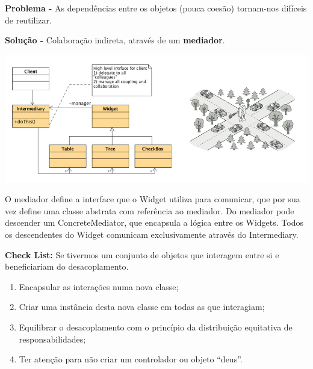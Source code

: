 \documentclass{article}
\begin{document}
\begin{flushleft}
    \textbf{Problema -} As dependências entre os objetos (pouca coesão) tornam-nos difíceis de reutilizar.
\end{flushleft}

\begin{flushleft}
    \textbf{Solução -} Colaboração indireta, através de um \textbf{mediador}.
\end{flushleft}

\begin{center}
    \includegraphics[scale=0.35]{Images/66.png}
\end{center}

O mediador define a interface que o Widget utiliza para comunicar, que por sua vez
define uma classe abstrata com referência ao mediador.
Do mediador pode descender um ConcreteMediator, que encapsula a lógica entre os
Widgets. Todos os descendentes do Widget comunicam exclusivamente através do
Intermediary.

\begin{flushleft}
    \textbf{Check List:}
    Se tivermos um conjunto de objetos que interagem entre si e beneficiariam do
    desacoplamento.
    \begin{enumerate}
        \item Encapsular as interações numa nova classe;
        \item Criar uma instância desta nova classe em todas as que interagiam;
        \item Equilibrar o desacoplamento com o princípio da distribuição equitativa de
        responsabilidades;
        \item Ter atenção para não criar um controlador ou objeto “deus”.
    \end{enumerate}
\end{flushleft}
\end{document}
